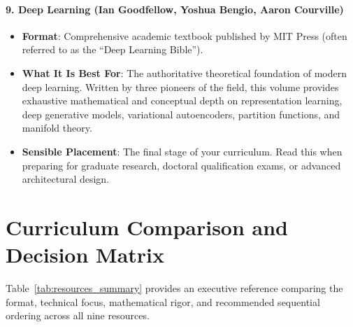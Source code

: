 \paragraph{9. Deep Learning (Ian Goodfellow, Yoshua Bengio, Aaron Courville)}
\begin{itemize}
    \item \textbf{Format}: Comprehensive academic textbook published by MIT Press (often referred to as the ``Deep Learning Bible'').
    \item \textbf{What It Is Best For}: The authoritative theoretical foundation of modern deep learning. Written by three pioneers of the field, this volume provides exhaustive mathematical and conceptual depth on representation learning, deep generative models, variational autoencoders, partition functions, and manifold theory.
    \item \textbf{Sensible Placement}: The final stage of your curriculum. Read this when preparing for graduate research, doctoral qualification exams, or advanced architectural design.
\end{itemize}

\section{Curriculum Comparison and Decision Matrix}\label{sec:curriculum_matrix}

Table~\ref{tab:resources_summary} provides an executive reference comparing the format, technical focus, mathematical rigor, and recommended sequential ordering across all nine resources.

